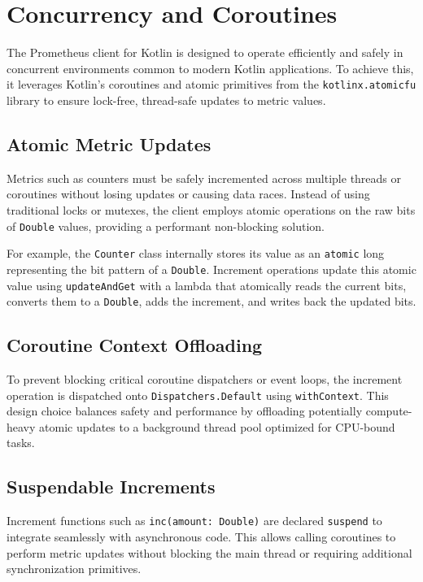 \section{Concurrency and Coroutines}

The Prometheus client for Kotlin is designed to operate efficiently and safely in concurrent environments common to modern Kotlin applications. To achieve this, it leverages Kotlin's coroutines and atomic primitives from the \texttt{kotlinx.atomicfu} library to ensure lock-free, thread-safe updates to metric values.

\subsection{Atomic Metric Updates}

Metrics such as counters must be safely incremented across multiple threads or coroutines without losing updates or causing data races. Instead of using traditional locks or mutexes, the client employs atomic operations on the raw bits of \texttt{Double} values, providing a performant non-blocking solution.

For example, the \texttt{Counter} class internally stores its value as an \texttt{atomic} long representing the bit pattern of a \texttt{Double}. Increment operations update this atomic value using \texttt{updateAndGet} with a lambda that atomically reads the current bits, converts them to a \texttt{Double}, adds the increment, and writes back the updated bits.

\subsection{Coroutine Context Offloading}

To prevent blocking critical coroutine dispatchers or event loops, the increment operation is dispatched onto \texttt{Dispatchers.Default} using \texttt{withContext}. This design choice balances safety and performance by offloading potentially compute-heavy atomic updates to a background thread pool optimized for CPU-bound tasks.

\subsection{Suspendable Increments}

Increment functions such as \texttt{inc(amount: Double)} are declared \texttt{suspend} to integrate seamlessly with asynchronous code. This allows calling coroutines to perform metric updates without blocking the main thread or requiring additional synchronization primitives.

